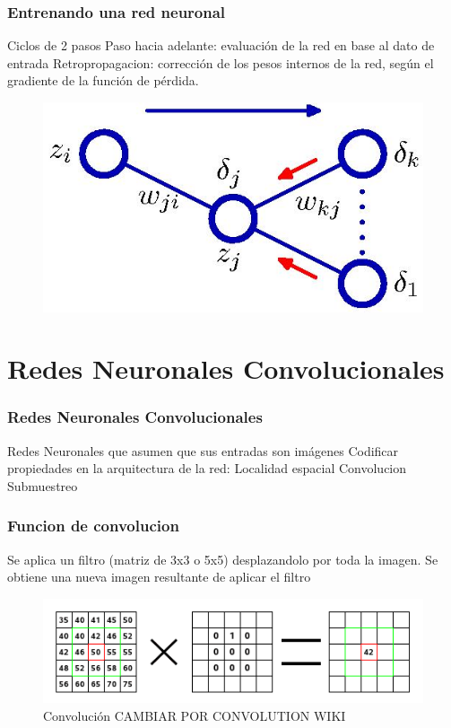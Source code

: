 \documentclass[12pt,center]{beamer}
\begin{document}
\begin{frame}
    \frametitle{Entrenando una red neuronal}
    Ciclos de 2 pasos
    Paso hacia adelante: evaluación de la red en base al dato de entrada
    Retropropagacion: corrección de los pesos internos de la red, según el gradiente de la función de pérdida.
    \begin{figure}[ht]
      \begin{center}
      \includegraphics[width=0.5\linewidth]{./img/bishop_backpropagation.jpg}
      \end{center}
      \label{fig:backpropagation}
    \end{figure}
\end{frame}


\section{Redes Neuronales Convolucionales}
\begin{frame}
  \frametitle{Redes Neuronales Convolucionales}
    Redes Neuronales que asumen que sus entradas son imágenes
      Codificar propiedades en la arquitectura de la red:
	Localidad espacial
	Convolucion
	Submuestreo
    
\end{frame}
  
\begin{frame}
  \frametitle{Funcion de convolucion}
    Se aplica un filtro (matriz de 3x3 o 5x5) desplazandolo por toda la imagen.
    Se obtiene una nueva imagen resultante de aplicar el filtro
    \begin{figure}[h]
      \begin{center}
      \includegraphics[width=0.8\linewidth]{./img/convolution.png}
      \end{center}
      \caption{Convolución CAMBIAR POR CONVOLUTION WIKI}
      \label{fig:convolution}
    \end{figure}
\end{frame}
  
\end{document}
